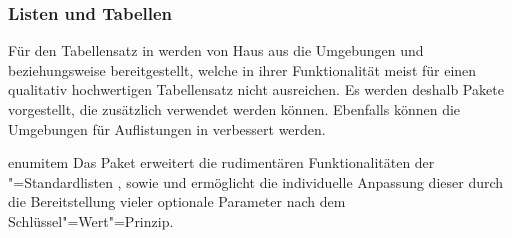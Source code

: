 \documentclass[%
  english,ngerman,%
  headings=optiontoheadandtoc,captions=tableheading,numbers=noenddot,%
  chapterpage,cdfoot,%
]{tudscrman}
\begin{document}
\subsubsection{Listen und Tabellen}
Für den Tabellensatz in  werden von Haus aus die Umgebungen 
 und  beziehungsweise 
 bereitgestellt, welche in ihrer Funktionalität meist für 
einen qualitativ hochwertigen Tabellensatz nicht ausreichen. Es werden deshalb 
Pakete vorgestellt, die zusätzlich verwendet werden können. Ebenfalls können die 
Umgebungen für Auflistungen in  verbessert werden.
\begin{packages}
\item[enumitem]
  Das Paket  erweitert die rudimentären Funktionalitäten der 
  "=Standardlisten , 
  sowie  und ermöglicht die individuelle Anpassung 
  dieser durch die Bereitstellung vieler optionale Parameter nach dem
  Schlüssel"=Wert"=Prinzip. 
  

\end{packages}
\end{document}
